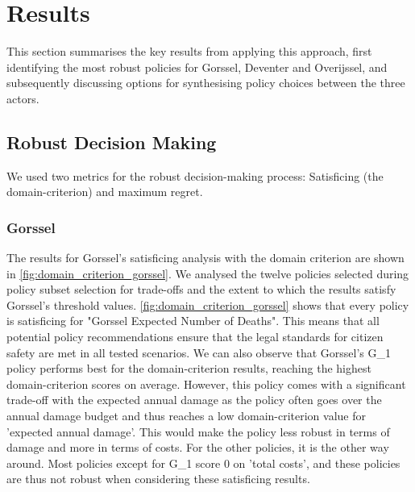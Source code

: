 \section{Results}
\label{s:results}

This section summarises the key results from applying this approach, first identifying the most robust policies for Gorssel, Deventer and Overijssel, and subsequently discussing options for synthesising policy choices between the three actors. 

\subsection{Robust Decision Making}
We used two metrics for the robust decision-making process: Satisficing (the domain-criterion) and maximum regret. 
\subsubsection{Gorssel}
The results for Gorssel's satisficing analysis with the domain criterion are shown in \autoref{fig:domain_criterion_gorssel}. We analysed the twelve policies selected during policy subset selection for trade-offs and the extent to which the results satisfy Gorssel's threshold values. \newline
\autoref{fig:domain_criterion_gorssel} shows that every policy is satisficing for "Gorssel Expected Number of Deaths". This means that all potential policy recommendations ensure that the legal standards for citizen safety are met in all tested scenarios. 
We can also observe that Gorssel's G\_1 policy performs best for the domain-criterion results, reaching the highest domain-criterion scores on average. However, this policy comes with a significant trade-off with the expected annual damage as the policy often goes over the annual damage budget and thus reaches a low domain-criterion value for 'expected annual damage'. This would make the policy less robust in terms of damage and more in terms of costs. For the other policies, it is the other way around. Most policies except for G\_1 score 0 on 'total costs', and these policies are thus not robust when considering these satisficing results.  \newline

